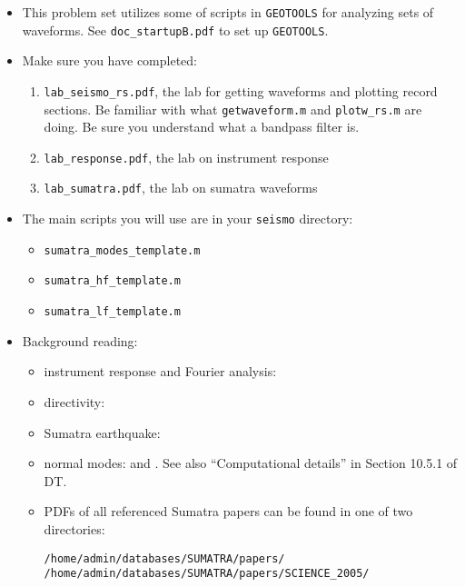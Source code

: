 \documentclass[11pt,titlepage,fleqn]{article}
\begin{document}
\begin{itemize}
\item This problem set utilizes some of scripts in \verb+GEOTOOLS+ for analyzing sets of waveforms. See \verb+doc_startupB.pdf+ to set up \verb+GEOTOOLS+.


\item Make sure you have completed:
%
\begin{enumerate}
\item \verb+lab_seismo_rs.pdf+, the lab for getting waveforms and plotting record sections.
Be familiar with what \verb+getwaveform.m+ and \verb+plotw_rs.m+ are doing.
Be sure you understand what a bandpass filter is.

\item \verb+lab_response.pdf+, the lab on instrument response

\item \verb+lab_sumatra.pdf+, the lab on sumatra waveforms
\end{enumerate}


\item The main scripts you will use are in your \verb+seismo+ directory:
%
\begin{itemize}
\item \verb+sumatra_modes_template.m+
\item \verb+sumatra_hf_template.m+
\item \verb+sumatra_lf_template.m+
\end{itemize}


\item Background reading:

\begin{itemize}
\item instrument response and Fourier analysis: \citet[][Ch.~6]{SteinWysession}
\item directivity: \citet[][Section 4.3.2]{SteinWysession} 
\item Sumatra earthquake: \citet{Lay2005,Ammon2005,Park2005,Ni2005,SSteinOkal2007}
\item normal modes: \citet[][Section 2.9]{SteinWysession} and \citet[][Ch.~8]{DT}. See also ``Computational details'' in Section 10.5.1 of DT.
\item PDFs of all referenced Sumatra papers can be found in one of two directories:
%
\begin{verbatim}
/home/admin/databases/SUMATRA/papers/
/home/admin/databases/SUMATRA/papers/SCIENCE_2005/
\end{verbatim}


\end{itemize}
\end{itemize}
\end{document}
